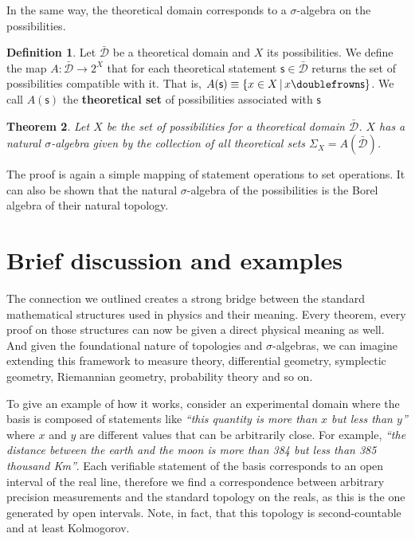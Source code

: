 \documentclass[%
reprint,
amsmath,amssymb,
aps,
prx,
]{revtex4-1}
\theoremstyle{plain}%
\newtheorem{thrm}{Theorem}[section]
\theoremstyle{definition}
\newtheorem{defn}[thrm]{Definition}
\theoremstyle{remark}
\def\comp{\doublefrown}
\newcommand{\stmt}[1][s] {\mathsf{#1}}
\newcommand{\tdomain}[1][D] {\bar{\mathcal{#1}}}
\newcommand{\statement}[1] {\emph{``#1''}}
\begin{document}
In the same way, the theoretical domain corresponds to a $\sigma$-algebra on the possibilities.

\begin{defn}
	Let $\tdomain$ be a theoretical domain and $X$ its possibilities. We define the map $A : \tdomain \rightarrow 2^X$ that for each theoretical statement $\stmt \in \tdomain$ returns the set of possibilities compatible with it. That is, $A(\stmt)\equiv\{ x \in X \, | \, x \comp \stmt\}$. We call $A(\stmt)$ the \textbf{theoretical set} of possibilities associated with $\stmt$
\end{defn}

\begin{thrm}
	Let $X$ be the set of possibilities for a theoretical domain $\tdomain$. $X$ has a natural $\sigma$-algebra given by the collection of all theoretical sets $\Sigma_X=A(\tdomain)$.
\end{thrm}

The proof is again a simple mapping of statement operations to set operations. It can also be shown that the natural $\sigma$-algebra of the possibilities is the Borel algebra of their natural topology.

\section{Brief discussion and examples}

The connection we outlined creates a strong bridge between the standard mathematical structures used in physics and their meaning. Every theorem, every proof on those structures can now be given a direct physical meaning as well. And given the foundational nature of topologies and $\sigma$-algebras, we can imagine extending this framework to measure theory, differential geometry, symplectic geometry, Riemannian geometry, probability theory and so on.

To give an example of how it works, consider an experimental domain where the basis is composed of statements like \statement{this quantity is more than $x$ but less than $y$} where $x$ and $y$ are different values that can be arbitrarily close. For example, \statement{the distance between the earth and the moon is more than 384 but less than 385 thousand Km}. Each verifiable statement of the basis corresponds to an open interval of the real line, therefore we find a correspondence between arbitrary precision measurements and the standard topology on the reals, as this is the one generated by open intervals. Note, in fact, that this topology is second-countable and at least Kolmogorov.
\end{document}
